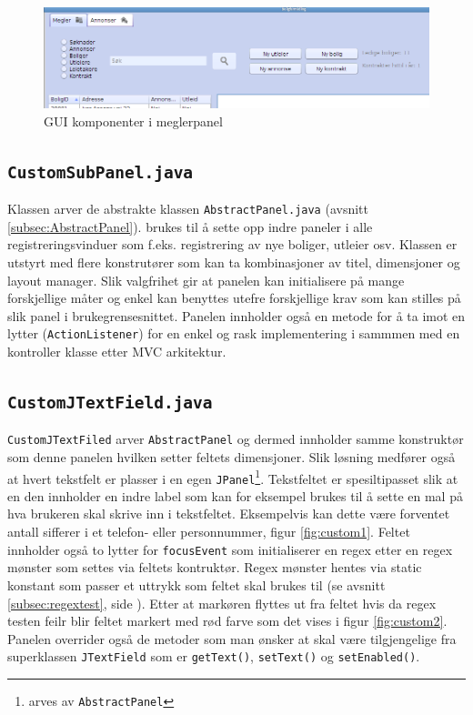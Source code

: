 \begin{figure}[ht]
 \includegraphics[width=\textwidth,height=\textheight,keepaspectratio]{./img/produktdokumentasjon/swing_componenter/megler_panel.png}
 \caption{GUI komponenter i meglerpanel}
 \label{fig:megler_panel}
\end{figure}




\subsection{\texttt{CustomSubPanel.java}}
Klassen arver de abstrakte klassen \texttt{AbstractPanel.java} (avsnitt \ref{subsec:AbstractPanel}). brukes til å sette opp indre paneler i alle registreringsvinduer som f.eks. registrering av nye boliger, utleier osv. Klassen er utstyrt med flere konstrutører som kan ta kombinasjoner av titel, dimensjoner og layout manager. Slik valgfrihet gir at panelen kan initialisere på mange forskjellige måter og enkel kan benyttes utefre forskjellige krav som kan stilles på slik panel i brukegrensesnittet. Panelen innholder også en metode for å ta imot en lytter (\texttt{ActionListener}) for en enkel og rask implementering i sammmen med en kontroller klasse etter MVC arkitektur.








\subsection{\texttt{CustomJTextField.java}}
\texttt{CustomJTextFiled} arver \texttt{AbstractPanel} og dermed innholder samme konstruktør som denne panelen hvilken setter feltets dimensjoner. Slik løsning medfører også at hvert tekstfelt er plasser i en egen \texttt{JPanel}\footnote{arves av \texttt{AbstractPanel}}.
Tekstfeltet er spesiltipasset slik at en den innholder en indre label som kan for eksempel brukes til å sette en mal på hva brukeren skal skrive inn i tekstfeltet. Eksempelvis kan dette være forventet antall sifferer i et telefon- eller personnummer, figur \ref{fig:custom1}. Feltet innholder også to lytter for \texttt{focusEvent} som initialiserer en regex etter en regex mønster som settes via feltets kontruktør. Regex mønster hentes via static konstant som passer et uttrykk som feltet skal brukes til (se avsnitt \ref{subsec:regextest}, side \pageref{subsec:regextest}). Etter at markøren flyttes ut fra feltet hvis da regex testen feilr blir feltet markert med rød farve som det vises i figur \ref{fig:custom2}.
Panelen overrider også de metoder som man ønsker at skal være tilgjengelige fra superklassen \texttt{JTextField} som er \texttt{getText()}, \texttt{setText()} og \texttt{setEnabled()}.

